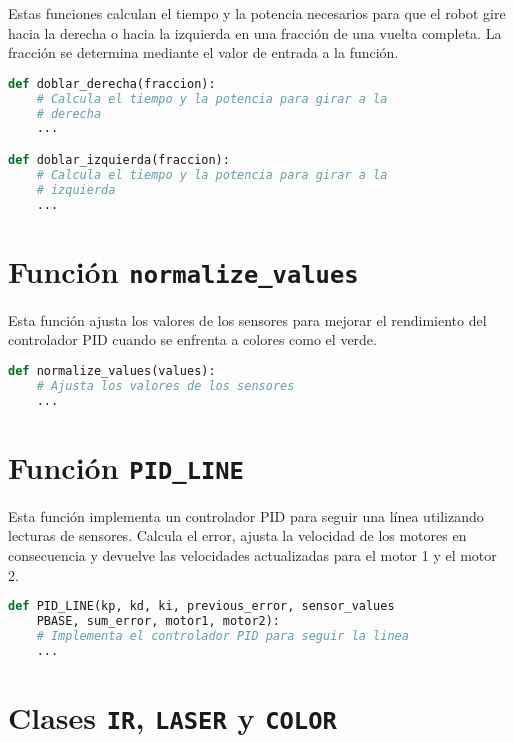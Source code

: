 \documentclass{article}
\begin{document}
Estas funciones calculan el tiempo y la potencia necesarios para que el robot gire hacia la derecha
o hacia la izquierda en una fracción de una vuelta completa. La fracción se determina 
mediante el valor de entrada a la función.

\begin{lstlisting}[language=Python, frame=single, backgroundcolor=\color{gray!10}]
def doblar_derecha(fraccion):
    # Calcula el tiempo y la potencia para girar a la 
    # derecha
    ...

def doblar_izquierda(fraccion):
    # Calcula el tiempo y la potencia para girar a la 
    # izquierda
    ...
\end{lstlisting}

\section{Función \texttt{normalize\_values}}

Esta función ajusta los valores de los sensores para mejorar el rendimiento del controlador PID cuando se enfrenta a colores como el verde.

\begin{lstlisting}[language=Python, frame=single, backgroundcolor=\color{gray!10}]
def normalize_values(values):
    # Ajusta los valores de los sensores
    ...
\end{lstlisting}

\section{Función \texttt{PID\_LINE}}

Esta función implementa un controlador PID para seguir una línea utilizando lecturas de sensores. Calcula el error, ajusta la velocidad de los motores en consecuencia y devuelve las velocidades actualizadas para el motor 1 y el motor 2.

\begin{lstlisting}[language=Python, frame=single, backgroundcolor=\color{gray!10}]
def PID_LINE(kp, kd, ki, previous_error, sensor_values
    PBASE, sum_error, motor1, motor2):
    # Implementa el controlador PID para seguir la linea
    ...
\end{lstlisting}

\section{Clases \texttt{IR}, \texttt{LASER} y \texttt{COLOR}}
\end{document}
